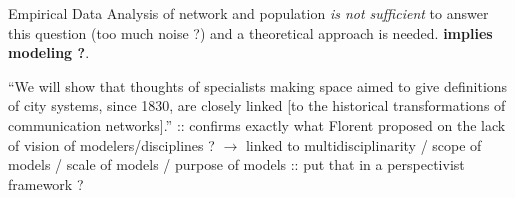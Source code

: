 Empirical Data Analysis of network and population \emph{is not sufficient} to answer this question (too much noise ?) and a theoretical approach is needed. \textbf{implies modeling ?}.

``We will show that thoughts of specialists making space aimed to give definitions of city systems, since 1830, are closely linked [to the historical transformations of communication networks].'' :: confirms exactly what Florent proposed on the lack of vision of modelers/disciplines ? $\rightarrow$ linked to multidisciplinarity / scope of models / scale of models / purpose of models :: put that in a perspectivist framework ? 













